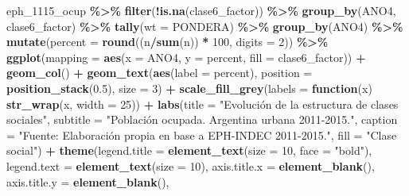 \documentclass[
]{article}
\newenvironment{Shaded}{\begin{snugshade}}{\end{snugshade}}
\newcommand{\AttributeTok}[1]{\textcolor[rgb]{0.13,0.29,0.53}{#1}}
\newcommand{\ControlFlowTok}[1]{\textcolor[rgb]{0.13,0.29,0.53}{\textbf{#1}}}
\newcommand{\DecValTok}[1]{\textcolor[rgb]{0.00,0.00,0.81}{#1}}
\newcommand{\FloatTok}[1]{\textcolor[rgb]{0.00,0.00,0.81}{#1}}
\newcommand{\FunctionTok}[1]{\textcolor[rgb]{0.13,0.29,0.53}{\textbf{#1}}}
\newcommand{\NormalTok}[1]{#1}
\newcommand{\SpecialCharTok}[1]{\textcolor[rgb]{0.81,0.36,0.00}{\textbf{#1}}}
\newcommand{\StringTok}[1]{\textcolor[rgb]{0.31,0.60,0.02}{#1}}
\begin{document}
\begin{Shaded}
\begin{Highlighting}[]
\NormalTok{eph\_1115\_ocup }\SpecialCharTok{\%\textgreater{}\%}
    \FunctionTok{filter}\NormalTok{(}\SpecialCharTok{!}\FunctionTok{is.na}\NormalTok{(clase6\_factor)) }\SpecialCharTok{\%\textgreater{}\%}
    \FunctionTok{group\_by}\NormalTok{(ANO4, clase6\_factor) }\SpecialCharTok{\%\textgreater{}\%}
    \FunctionTok{tally}\NormalTok{(}\AttributeTok{wt =}\NormalTok{ PONDERA) }\SpecialCharTok{\%\textgreater{}\%}
    \FunctionTok{group\_by}\NormalTok{(ANO4) }\SpecialCharTok{\%\textgreater{}\%}
    \FunctionTok{mutate}\NormalTok{(}\AttributeTok{percent =} \FunctionTok{round}\NormalTok{((n}\SpecialCharTok{/}\FunctionTok{sum}\NormalTok{(n)) }\SpecialCharTok{*} \DecValTok{100}\NormalTok{, }\AttributeTok{digits =} \DecValTok{2}\NormalTok{)) }\SpecialCharTok{\%\textgreater{}\%}
    \FunctionTok{ggplot}\NormalTok{(}\AttributeTok{mapping =} \FunctionTok{aes}\NormalTok{(}\AttributeTok{x =}\NormalTok{ ANO4, }\AttributeTok{y =}\NormalTok{ percent, }\AttributeTok{fill =}\NormalTok{ clase6\_factor)) }\SpecialCharTok{+} \FunctionTok{geom\_col}\NormalTok{() }\SpecialCharTok{+}
    \FunctionTok{geom\_text}\NormalTok{(}\FunctionTok{aes}\NormalTok{(}\AttributeTok{label =}\NormalTok{ percent), }\AttributeTok{position =} \FunctionTok{position\_stack}\NormalTok{(}\FloatTok{0.5}\NormalTok{), }\AttributeTok{size =} \DecValTok{3}\NormalTok{) }\SpecialCharTok{+} \FunctionTok{scale\_fill\_grey}\NormalTok{(}\AttributeTok{labels =} \ControlFlowTok{function}\NormalTok{(x) }\FunctionTok{str\_wrap}\NormalTok{(x,}
    \AttributeTok{width =} \DecValTok{25}\NormalTok{)) }\SpecialCharTok{+} \FunctionTok{labs}\NormalTok{(}\AttributeTok{title =} \StringTok{"Evolución de la estructura de clases sociales"}\NormalTok{,}
    \AttributeTok{subtitle =} \StringTok{"Población ocupada. Argentina urbana 2011{-}2015."}\NormalTok{, }\AttributeTok{caption =} \StringTok{"Fuente: Elaboración propia en base a EPH{-}INDEC 2011{-}2015."}\NormalTok{,}
    \AttributeTok{fill =} \StringTok{"Clase social"}\NormalTok{) }\SpecialCharTok{+} \FunctionTok{theme}\NormalTok{(}\AttributeTok{legend.title =} \FunctionTok{element\_text}\NormalTok{(}\AttributeTok{size =} \DecValTok{10}\NormalTok{, }\AttributeTok{face =} \StringTok{"bold"}\NormalTok{),}
    \AttributeTok{legend.text =} \FunctionTok{element\_text}\NormalTok{(}\AttributeTok{size =} \DecValTok{10}\NormalTok{), }\AttributeTok{axis.title.x =} \FunctionTok{element\_blank}\NormalTok{(), }\AttributeTok{axis.title.y =} \FunctionTok{element\_blank}\NormalTok{(),}

\end{Highlighting}
\end{Shaded}
\end{document}
